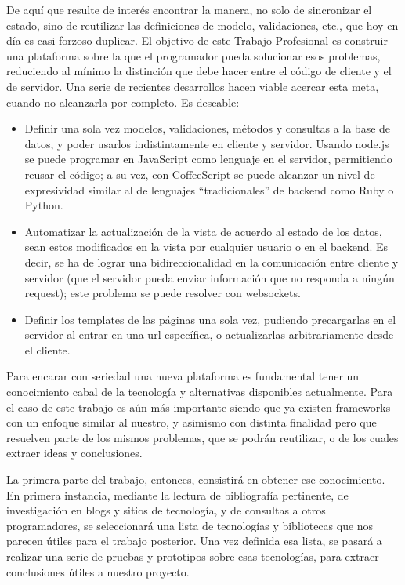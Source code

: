 \documentclass[doc,helv,longtable]{article}
\begin{document}
De aquí que resulte de interés encontrar la manera, no solo de sincronizar el estado, sino de reutilizar las definiciones de modelo, validaciones, etc., que hoy en día es casi forzoso duplicar. El objetivo de este Trabajo Profesional es construir una plataforma sobre la que el programador pueda solucionar esos problemas, reduciendo al mínimo la distinción que debe hacer entre el código de cliente y el de servidor. Una serie de recientes desarrollos hacen viable acercar esta meta, cuando no alcanzarla por completo. Es deseable:


\begin{itemize}
\item  Definir una sola vez modelos, validaciones, métodos y consultas a la base de datos, y poder usarlos indistintamente en cliente y servidor. Usando node.js\cite{node} se puede programar en JavaScript como lenguaje en el servidor, permitiendo reusar el código; a su vez, con CoffeeScript\cite{coffee} se puede alcanzar un nivel de expresividad similar al de lenguajes “tradicionales” de backend como Ruby o Python.
\item  Automatizar la actualización de la vista de acuerdo al estado de los datos, sean estos modificados en la vista por cualquier usuario o en el backend. Es decir, se ha de lograr una bidireccionalidad en la comunicación entre cliente y servidor (que el servidor pueda enviar información que no responda a ningún request); este problema se puede resolver con websockets\cite{websockets}.
\item  Definir los templates de las páginas una sola vez, pudiendo precargarlas en el servidor al entrar en una url específica, o actualizarlas arbitrariamente desde el cliente.

\end{itemize}


Para encarar con seriedad una nueva plataforma es fundamental tener un conocimiento cabal de la tecnología y alternativas disponibles actualmente. Para el caso de este trabajo es aún más importante siendo que ya existen frameworks con un enfoque similar al nuestro, y asimismo con distinta finalidad pero que resuelven parte de los mismos problemas, que se podrán reutilizar, o de los cuales extraer ideas y conclusiones. 

La primera parte del trabajo, entonces, consistirá en obtener ese conocimiento. En primera instancia, mediante la lectura de bibliografía pertinente, de investigación en blogs y sitios de tecnología, y de consultas a otros programadores, se seleccionará una lista de tecnologías y bibliotecas que nos parecen útiles para el trabajo posterior. Una vez definida esa lista, se pasará a realizar una serie de pruebas y prototipos sobre esas tecnologías, para extraer conclusiones útiles a nuestro proyecto.
\end{document}
